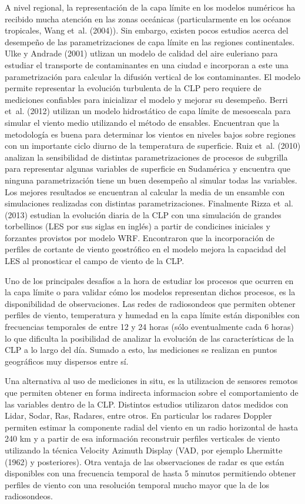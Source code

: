\documentclass[12pt,spanish,oneside, a4paper]{book}
\begin{document}
A nivel regional, la representación de la capa límite en los modelos
numéricos ha recibido mucha atención en las zonas oceánicas
(particularmente en los océanos tropicales, Wang et~al. (2004)). Sin
embargo, existen pocos estudios acerca del desempeño de las
parametrizaciones de capa límite en las regiones continentales. Ulke y
Andrade (2001) utlizan un modelo de calidad del aire euleriano para
estudiar el transporte de contaminantes en una ciudad e incorporan a
este una parametrización para calcular la difusión vertical de los
contaminantes. El modelo permite representar la evolución turbulenta de
la CLP pero requiere de mediciones confiables para inicializar el modelo
y mejorar su desempeño. Berri et~al. (2012) utilizan un modelo
hidrostático de capa límite de mesoescala para simular el viento medio
utilizando el método de ensables. Encuentran que la metodología es buena
para determinar los vientos en niveles bajos sobre regiones con un
importante ciclo diurno de la temperatura de superficie. Ruiz et~al.
(2010) analizan la sensibilidad de distintas parametrizaciones de
procesos de subgrilla para representar algunas variables de superficie
en Sudamérica y encuentra que ninguna parametrización tiene un buen
desempeño al simular todas las variables. Los mejores resultados se
encuentran al calcular la media de un ensamble con simulaciones
realizadas con distintas parametrizaciones. Finalmente Rizza et~al.
(2013) estudian la evolución diaria de la CLP con una simulación de
grandes torbellinos (LES por sus siglas en inglés) a partir de
condicines iniciales y forzantes provistos por modelo WRF. Encontraron
que la incorporación de perfiles de cortante de viento geostrófico en el
modelo mejora la capacidad del LES al pronosticar el campo de viento de
la CLP.

Uno de los principales desafíos a la hora de estudiar los procesos que
ocurren en la capa límite o para validar cómo los modelos representan
dichos procesos, es la disponibilidad de observaciones. Las redes de
radiosondeos que permiten obtener perfiles de viento, temperatura y
humedad en la capa límite están disponibles con frecuencias temporales
de entre 12 y 24 horas (sólo eventualmente cada 6 horas) lo que
dificulta la posibilidad de analizar la evolución de las características
de la CLP a lo largo del día. Sumado a esto, las mediciones se realizan
en puntos geográficos muy dispersos entre sí.

Una alternativa al uso de mediciones in situ, es la utilizacion de
sensores remotos que permiten obtener en forma indirecta informacion
sobre el comportamiento de las variables dentro de la CLP. Distintos
estudios utilizaron datos medidos con Lidar, Sodar, Ras, Radares, entre
otros. En particular los radares Doppler permiten estimar la componente
radial del viento en un radio horizontal de hasta 240 km y a partir de
esa información reconstruir perfiles verticales de viento utilizando la
técnica Velocity Azimuth Display (VAD, por ejemplo Lhermitte (1962) y
posteriores). Otra ventaja de las observaciones de radar es que están
disponibles con una frecuencia temporal de hasta 5 minutos permitiendo
obtener perfiles de viento con una resolución temporal mucho mayor que
la de los radiosondeos.
\end{document}
